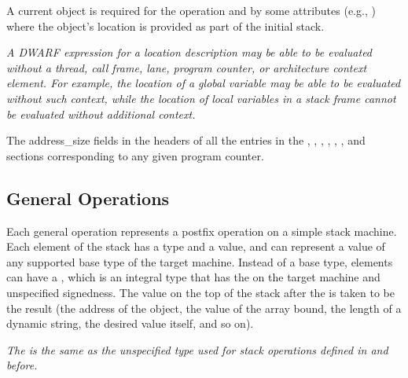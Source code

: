 \begin{enumerate}[1. ]
A current object is required for the \DWOPpushobjectaddress operation
and by some attributes (e.g., \DWATdatamemberlocation) where the
object's location is provided as part of the initial stack.

\end{enumerate}

\textit{A DWARF expression for a location description may be able to
be evaluated without a thread, call frame, lane, program counter, or
architecture context element. For example, the location of a global
variable may be able to be evaluated without such context, while the
location of local variables in a stack frame cannot be evaluated
without additional context.}

The address\_size fields in the headers of all the entries in the
\dotdebuginfo, \dotdebugaddr, \dotdebugline, \dotdebugrnglists{},
\dotdebugrnglistsdwo{}, \dotdebugloclists{}, and
\dotdebugloclistsdwo{} sections corresponding to any given program
counter.

\subsection{General Operations}
\label{chap:generaloperations}
Each general operation represents a postfix operation on
a simple stack machine. 
Each element of the stack has a type and a value, and can represent
a value of any supported base type of the target machine.  Instead of
a base type, elements can have a 
,
which is an integral type that has the 
 on the target machine and 
unspecified signedness. The value on the top of the stack after 
 the 
is 
taken to be the result (the address of the object, the
value of the array bound, the length of a dynamic string,
the desired value itself, and so on).

\textit{The
\generictype{} is the same as the unspecified type used for stack operations
defined in \DWARFVersionIV{} and before.
}

